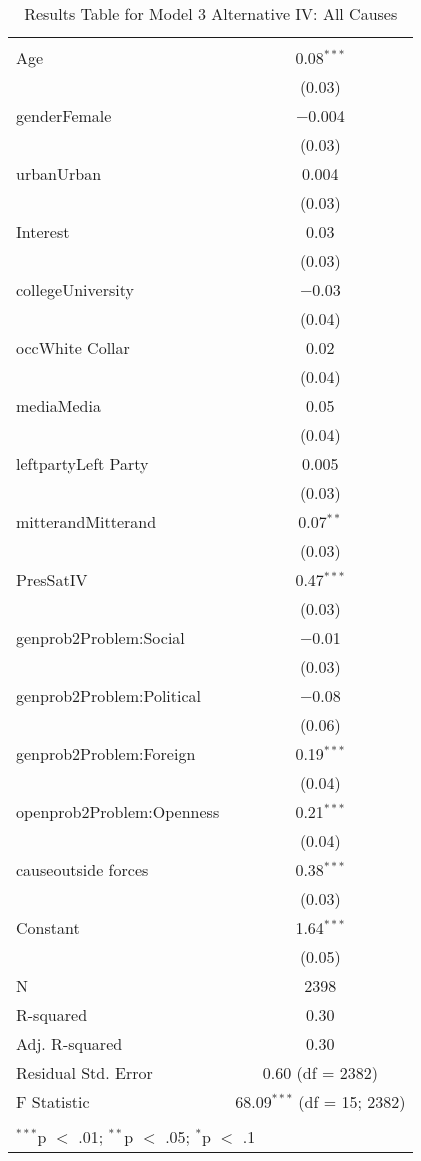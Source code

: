 
\begin{table}[!htbp] \centering 
  \caption{Results Table for Model 3 Alternative IV: All Causes} 
  \label{} 
\footnotesize 
\begin{tabular}{@{\extracolsep{5pt}}lc} 
\\[-1.8ex]\hline \\[-1.8ex] 
\hline \\[-1.8ex] 
 Age & 0.08$^{***}$ \\ 
  & (0.03) \\ 
  genderFemale & $-$0.004 \\ 
  & (0.03) \\ 
  urbanUrban & 0.004 \\ 
  & (0.03) \\ 
  Interest & 0.03 \\ 
  & (0.03) \\ 
  collegeUniversity & $-$0.03 \\ 
  & (0.04) \\ 
  occWhite Collar & 0.02 \\ 
  & (0.04) \\ 
  mediaMedia & 0.05 \\ 
  & (0.04) \\ 
  leftpartyLeft Party & 0.005 \\ 
  & (0.03) \\ 
  mitterandMitterand & 0.07$^{**}$ \\ 
  & (0.03) \\ 
  PresSatIV & 0.47$^{***}$ \\ 
  & (0.03) \\ 
  genprob2Problem:Social & $-$0.01 \\ 
  & (0.03) \\ 
  genprob2Problem:Political & $-$0.08 \\ 
  & (0.06) \\ 
  genprob2Problem:Foreign & 0.19$^{***}$ \\ 
  & (0.04) \\ 
  openprob2Problem:Openness & 0.21$^{***}$ \\ 
  & (0.04) \\ 
  causeoutside forces & 0.38$^{***}$ \\ 
  & (0.03) \\ 
  Constant & 1.64$^{***}$ \\ 
  & (0.05) \\ 
 N & 2398 \\ 
R-squared & 0.30 \\ 
Adj. R-squared & 0.30 \\ 
Residual Std. Error & 0.60 (df = 2382) \\ 
F Statistic & 68.09$^{***}$ (df = 15; 2382) \\ 
\hline \\[-1.8ex] 
\multicolumn{2}{l}{$^{***}$p $<$ .01; $^{**}$p $<$ .05; $^{*}$p $<$ .1} \\ 
\end{tabular} 
\end{table} 
